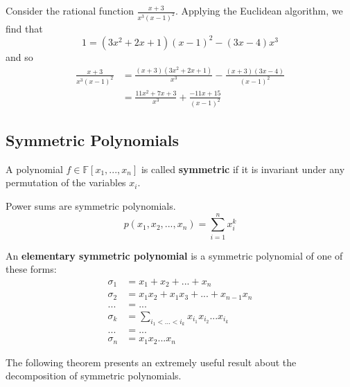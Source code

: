   \begin{example}
    Consider the rational function $\frac{x + 3}{x^3 (x - 1)^2}$. Applying the Euclidean algorithm, we find that 
    \begin{equation}
      1 = (3x^2 + 2x + 1) (x - 1)^2 - (3x - 4) x^3
    \end{equation}
    and so 
    \begin{align}
      \frac{x + 3}{x^3 (x - 1)^2} & = \frac{(x + 3)(3x^2 + 2x + 1)}{x^3} - \frac{(x + 3)(3x - 4)}{(x - 1)^2} \\
                                  & = \frac{11x^2 + 7x + 3}{x^3} + \frac{-11x + 15}{(x - 1)^2}
    \end{align}
  \end{example}

\subsection{Symmetric Polynomials}

  \begin{definition}
    A polynomial $f \in \mathbb{F}[x_1, ..., x_n]$ is called \textbf{symmetric} if it is invariant under any permutation of the variables $x_i$. 
  \end{definition}

  \begin{example}
    Power sums are symmetric polynomials. 
    \begin{equation}
      p(x_1, x_2, ..., x_n) = \sum_{i=1}^n x_i^k
    \end{equation}
  \end{example}

  \begin{definition}
    An \textbf{elementary symmetric polynomial} is a symmetric polynomial of one of these forms: 
    \begin{align*}
      \sigma_1 & = x_1 + x_2 + ... + x_n \\
      \sigma_2 & = x_1 x_2 + x_1 x_3 + ... + x_{n-1} x_n \\
      ... & = ... \\
      \sigma_k & = \sum_{i_1 < ... < i_k} x_{i_1} x_{i_2} ... x_{i_k} \\
      ... & = ... \\
      \sigma_n & = x_1 x_2 ... x_n
    \end{align*}
  \end{definition}

  The following theorem presents an extremely useful result about the decomposition of symmetric polynomials. 

